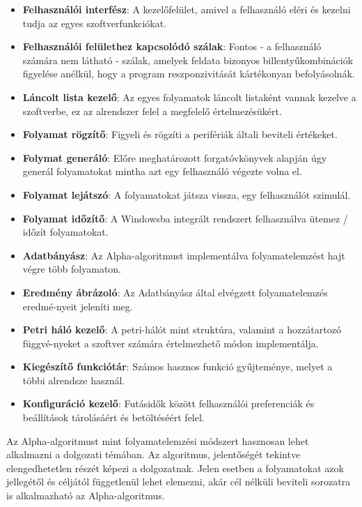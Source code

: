 \begin{itemize}
	\item \textbf{Felhasználói interfész}: A kezelőfelület, amivel a felhasználó eléri és kezelni tudja az egyes szoftverfunkciókat.
	\item \textbf{Felhasználói felülethez kapcsolódó szálak}: Fontos - a felhasználó számára nem látható - szálak, amelyek feldata bizonyos billentyűkombinációk figyelése anélkül, hogy a program reszponzivitását kártékonyan befolyásolnák.
	\item \textbf{Láncolt lista kezelő}: Az egyes folyamatok láncolt listaként vannak kezelve a szoftverbe, ez az alrendszer felel a megfelelő értelmezésükért. 
	\item \textbf{Folyamat rögzítő}: Figyeli és rögzíti a perifériák általi beviteli értékeket.
	\item \textbf{Folymat generáló}: Előre meghatározott forgatóvkönyvek alapján úgy generál folyamatokat mintha azt egy felhasználó végezte volna el.
	\item \textbf{Folyamat lejátszó}: A folyamatokat játsza vissza, egy felhasználót szimulál.
	\item \textbf{Folyamat időzítő}: A Windowsba integrált rendszert felhasználva ütemez / időzít folyamatokat.
	\item \textbf{Adatbányász}: Az Alpha-algoritmust implementálva folyamatelemzést hajt végre több folyamaton.
	\item \textbf{Eredmény ábrázoló}: Az Adatbányász által elvégzett folyamatelemzés eredmé\hyp{}nyeit jeleníti meg.
	\item \textbf{Petri háló kezelő}: A petri-hálót mint struktúra, valamint a hozzátartozó függvé\hyp{}nyeket a szoftver számára értelmezhető módon implementálja.
	\item \textbf{Kiegészítő funkciótár}: Számos hasznos funkció gyűjteménye, melyet a többi alrendsze használ.
	\item \textbf{Konfiguráció kezelő}: Futásidők között felhasználói preferenciák és beállítások tárolásáért és betöltéséért felel.
\end{itemize}


Az Alpha-algoritmust mint folyamatelemzési módszert hasznosan lehet alkalmazni a dolgozati témában. Az algoritmus, jelentőségét tekintve elengedhetetlen részét képezi a dolgozatnak. Jelen esetben a folyamatokat azok jellegétől és céljától függetlenül lehet elemezni, akár cél nélküli beviteli sorozatra is alkalmazható az Alpha-algoritmus.

